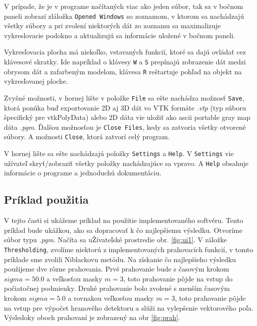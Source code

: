 \documentclass[a4paper,11pt,oneside]{article}%
\begin{document}
V prípade, že je v programe načítaných viac ako jeden súbor, tak sa v bočnom paneli zobrazí zláložka  \texttt{Opened Windows} so zoznamom, v ktorom sa nachádzajú všetky súbory a pri zvolení niektorých dát zo zoznamu sa maximalizuje vykreslovacie podokno a aktualizujú sa informácie uložené v bočnom paneli.  

Vykresľovacia plocha má niekoľko, vstavaných funkcií, ktoré sa dajú ovládať cez klávesové skratky. Ide napríklad o klávesy \texttt{W} a \texttt{S} prepínajú zobrazenie dát medzi obrysom dát a zafarbeným modelom, klávesa \texttt{R} reštartuje pohľad na objekt na vykresľovanej ploche.
 
Zvyšné možnosti, v hornej lište v položke \texttt{File} sa ešte nachádza možnosť \texttt{Save}, ktorá ponúka buď exportovanie 2D aj 3D dát vo VTK formáte \textit{.vtp} (typ súboru špecifický pre vtkPolyData) alebo 2D dáta vie uložiť ako ascii portable gray map dáta \textit{.pgm}. Ďalšou možnosťou je \texttt{Close Files}, kedy sa zatvoria všetky otvorené súbory. A možnosti \texttt{Close}, ktorá zatvorí celý program.

V hornej lište sa ešte nachádzajú položky \texttt{Settings} a \texttt{Help}. V \texttt{Settings} vie užívateľ skryť/zobraziť všetky položky nachádzajúce sa vpravo. A \texttt{Help} obsahuje informácie o programe a jednoduchú dokumentáciu.

\subsection{Príklad použitia}

V tejto časti si ukážeme príklad na použitie implementovaného softvéru. Tento príklad bude ukážkou, ako sa dopracovať k čo najlepšiemu výsledku. Otvoríme súbor typu \textit{.pgm}. Načíta sa uŽívateľské prostredie obr. \ref{fig:ui1}. V záložke \texttt{Thresholding}, zvolíme niektorú z implementovaných prahovacích funkcií, v tomto príklade sme zvolili Niblackovu metódu. Na získanie čo najlepšieho výsledku použijeme dve rôzne prahovania. Prvé prahovanie bude s časovým krokom $sigma = 50.0$ a veľkosťou masky $m = 3$, toto prahovanie pôjde na vstup do počiatočnej podmienky. Druhé prahovanie bolo zvolené s menším časovým krokom $sigma = 5.0$ a rovnakou veľkosťou masky $m = 3$, toto prahovanie pôjde na vstup pre výpočet hranového detektoru a slúži na vylepšenie vektorového poľa. Výsledoky oboch prahovaní je zobrazený na obr \ref{fig:prah}.
\end{document}
